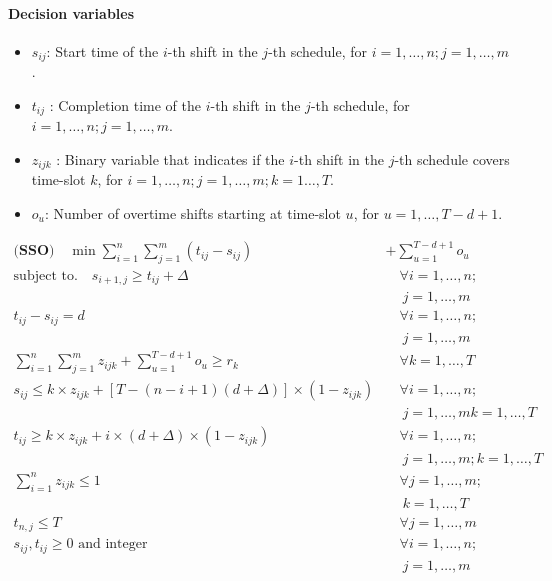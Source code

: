 \documentclass[11pt]{article}
\begin{document}
\paragraph{Decision variables} 
\begin{itemize}
\item $s_{ij}$: Start time of the $i$-th shift in the $j$-th schedule, for $i = 1,\ldots,n; j=1,\ldots,m$. 
\item  $t_{ij}$ : Completion time of the $i$-th shift in the $j$-th schedule, for $i = 1,\ldots,n; j=1,\ldots,m$.
\item $z_{ijk}$ : Binary  variable that indicates if the $i$-th shift in the $j$-th schedule covers time-slot $k$, for $ i = 1,\ldots,n; j=1,\ldots,m; k=1\ldots,T$.
\item $o_{u}$: Number of overtime shifts starting at time-slot $u$, for $u= 1,\ldots, T-d+1$.
\end{itemize}
\begin{align}
\label{eq.ATCSobj}\textbf{(SSO)}\quad\min \sum_{i=1}^{n}\sum_{j=1}^{m}(t_{ij}-s_{ij}) &+ \sum_{u=1}^{T-d+1} o_{u}\\
\label{eq.ATCSnextshiftcon}\text{subject to.} \quad s_{i+1,j} \ge t_{ij} + \Delta &\quad \forall i=1,\ldots,n;\\
\nonumber &\quad\  j=1,\ldots, m\\
\label{eq.ATCSminshiftlength}t_{ij} - s_{ij} = d  &\quad \forall i=1,\ldots,n; \\
\nonumber &\quad\ j=1,\ldots, m\\
\label{eq.ATCSdemandcon} \sum_{i=1}^{n}\sum_{j=1}^{m}z_{ijk} + \sum_{u=1}^{T-d+1}o_{u}\ge r_k  &\quad \forall k=1,\ldots,T\\
\label{eq.ATCSstartb4k}s_{ij} \le k\times z_{ijk} + [T-(n-i+1)(d + \Delta)]\times(1-z_{ijk}) &\quad \forall i=1,\ldots,n; \\
\nonumber &\quad \ j=1,\ldots, m k=1,\ldots,T\\
\label{eq.ATCSendafterk}t_{ij} \ge k\times z_{ijk} + i\times(d+\Delta)\times(1-z_{ijk}) &\quad \forall  i=1,\ldots,n; \\
\nonumber &\quad \ j=1,\ldots, m; k=1,\ldots,T\\
\label{eq.ATCSdisaggZ}\sum_{i=1}^{n}z_{ijk} \le 1 &\quad  \forall  j=1,\ldots, m; \\[-3mm]
\nonumber &\quad\ k=1,\ldots,T\\
\label{eq.lastshiftbound} t_{n,j}\le T &\quad \forall  j=1,\ldots, m\\
\label{eq.ATCSNN} s_{ij}, t_{ij}  \ge 0 \text{ and integer}  &\quad \forall  i=1,\ldots,n; \\
\nonumber & \quad\ j=1,\ldots, m
\end{align}




% 

\end{document}
